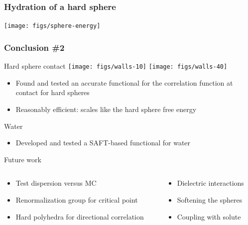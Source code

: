 
\begin{frame}
  \frametitle{Hydration of a hard sphere}
  \begin{center}
    \vspace{-1em}
    \texttt{[image: figs/sphere-energy]}
  \end{center}
  \vspace{-1.5em}
\end{frame}

\begin{frame}
  \frametitle{Conclusion \#2}
  \vspace{2em}
  \begin{block}{Hard sphere contact}
    \vspace{-6em}
    \hfill
    \texttt{[image: figs/walls-10]}
    \texttt{[image: figs/walls-40]}
    \begin{itemize}
    \item Found and tested an accurate functional for the correlation
      function at contact for hard spheres
    \item Reasonably efficient: scales like the hard sphere free
      energy
    \end{itemize}
  \end{block}
  \begin{block}{Water}
    \begin{itemize}
    \item Developed and tested a SAFT-based functional for water
    \end{itemize}
  \end{block}
  \begin{block}{Future work}
    \begin{columns}
      \begin{column}{0.7\columnwidth}
        \begin{itemize}
        \item Test dispersion versus MC
        \item Renormalization group for critical point
        \item Hard polyhedra for directional correlation
        \end{itemize}
      \end{column}
      \begin{column}{0.5\columnwidth}
        \begin{itemize}
        \item Dielectric interactions
        \item Softening the spheres
        \item Coupling with solute
        \end{itemize}
      \end{column}
    \end{columns}
  \end{block}
\end{frame}
